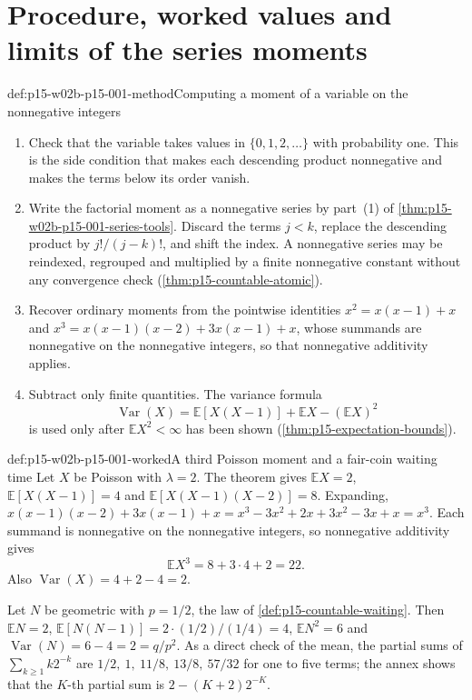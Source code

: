 \section{Procedure, worked values and limits of the series moments}
\label{sec:p15-w02b-p15-001-procedure}

\begin{hbmethod}{def:p15-w02b-p15-001-method}{Computing a moment of a variable on the nonnegative integers}
\par\nobreak
\begin{enumerate}
\item Check that the variable takes values in \(\{0,1,2,\ldots\}\)
      with probability one. This is the side condition that makes each
      descending product nonnegative and makes the terms below its order
      vanish.
\item Write the factorial moment as a nonnegative series by part~(1) of
      \cref{thm:p15-w02b-p15-001-series-tools}. Discard the terms
      \(j<k\), replace the descending product by \(j!/(j-k)!\), and
      shift the index. A nonnegative series may be reindexed, regrouped
      and multiplied by a finite nonnegative constant without any
      convergence check (\cref{thm:p15-countable-atomic}).
\item Recover ordinary moments from the pointwise identities
      \(x^2=x(x-1)+x\) and \(x^3=x(x-1)(x-2)+3x(x-1)+x\), whose
      summands are nonnegative on the nonnegative integers, so that
      nonnegative additivity applies.
\item Subtract only finite quantities. The variance formula
      \[
       \operatorname{Var}(X)=\mathbb E[X(X-1)]+\mathbb EX-(\mathbb EX)^2
      \]
      is used only after \(\mathbb EX^2<\infty\) has been shown
      (\cref{thm:p15-expectation-bounds}).
\end{enumerate}
\end{hbmethod}

\begin{hbexample}{def:p15-w02b-p15-001-worked}{A third Poisson moment and a fair-coin waiting time}
Let \(X\) be Poisson with \(\lambda=2\). The theorem gives
\(\mathbb EX=2\), \(\mathbb E[X(X-1)]=4\) and
\(\mathbb E[X(X-1)(X-2)]=8\). Expanding,
\(x(x-1)(x-2)+3x(x-1)+x=x^3-3x^2+2x+3x^2-3x+x=x^3\). Each summand
is nonnegative on the nonnegative integers, so nonnegative additivity
gives
\[
 \mathbb EX^3=8+3\cdot4+2=22.
\]
Also \(\operatorname{Var}(X)=4+2-4=2\).

Let \(N\) be geometric with \(p=1/2\), the law of
\cref{def:p15-countable-waiting}. Then
\(\mathbb EN=2\), \(\mathbb E[N(N-1)]=2\cdot(1/2)/(1/4)=4\),
\(\mathbb EN^2=6\) and \(\operatorname{Var}(N)=6-4=2=q/p^2\).
As a direct check of the mean, the partial sums of
\(\sum_{k\geq1}k2^{-k}\) are
\(1/2,\ 1,\ 11/8,\ 13/8,\ 57/32\) for one to five terms; the
annex shows that the \(K\)-th partial sum is \(2-(K+2)2^{-K}\).
\end{hbexample}

